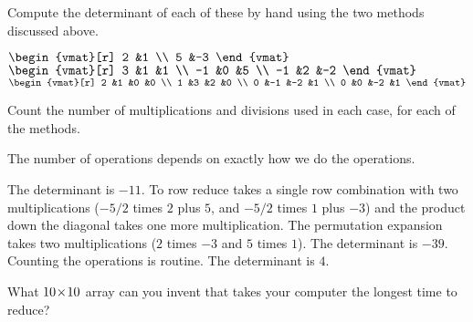\begin{exercises}
\begin{answer}
    \end{answer}
  \item 
    Compute the determinant of each of these by hand using the 
    two methods discussed above.
    \begin{exparts*}
      \partsitem $\begin{vmat}[r]
                    2  &1  \\
                    5  &-3
                  \end{vmat}$
      \partsitem $\begin{vmat}[r]
                    3  &1  &1  \\
                   -1  &0  &5  \\
                   -1  &2  &-2 
                  \end{vmat}$
      \partsitem $\begin{vmat}[r]
                    2  &1  &0  &0  \\
                    1  &3  &2  &0  \\
                    0  &-1 &-2 &1  \\
                    0  &0  &-2 &1
                  \end{vmat}$
    \end{exparts*}
    Count the number of multiplications and divisions used in each case,
    for each of the methods.
     \begin{answer}
       The number of operations depends on exactly how we do the operations.
       \begin{exparts}
         \partsitem The determinant is $-11$.
           To row reduce takes a single row combination 
           with two multiplications
           ($-5/2$ times $2$ plus $5$, and $-5/2$ times $1$ plus $-3$)
           and the product down the diagonal takes one more multiplication.
           The permutation expansion takes two multiplications ($2$ times
           $-3$ and $5$ times $1$).
         \partsitem The determinant is $-39$.
           Counting the operations is routine.
         \partsitem The determinant is $4$.
       \end{exparts}
     \end{answer}
  \item 
    What $10 \! \times \! 10$ array can you invent that takes your computer
    the longest time to reduce?

\end{exercises}
